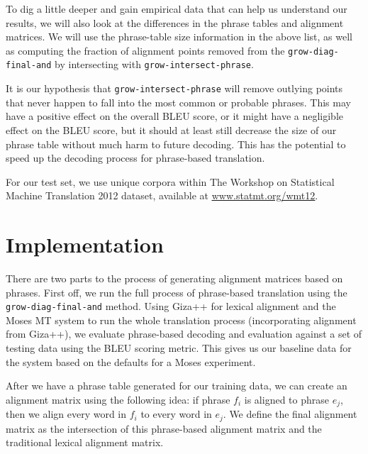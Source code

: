 \documentclass[twocolumn]{article}
\newcommand{\originalAlign}{\texttt{grow-diag-final-and}}
\newcommand{\phraseIntersectAlign}{\texttt{grow-intersect-phrase}}
\begin{document}
To dig a little deeper and gain empirical data that can help us understand our
results, we will also look at the differences in the phrase tables and alignment
matrices. We will use the phrase-table size information in the above list, as
well as computing the fraction of alignment points removed from the
\originalAlign{} by intersecting with \phraseIntersectAlign{}.

It is our hypothesis that \phraseIntersectAlign{} will remove outlying
points that never happen to fall into the most common or probable phrases. This
may have a positive effect on the overall BLEU score, or it might have a
negligible effect on the BLEU score, but it should at least still decrease the
size of our phrase table without much harm to future decoding. This has the
potential to speed up the decoding process for phrase-based translation.

For our test set, we use unique corpora within
The Workshop on Statistical Machine Translation 2012 dataset,
available at
\href{http://www.statmt.org/wmt12/dev.tgz}
     {\underline{www.statmt.org/wmt12}}.


\section{Implementation}
There are two parts to the process of generating alignment matrices based on
phrases. First off, we run the full process of phrase-based translation using
the \originalAlign{} method. Using Giza++ for lexical alignment and the Moses MT
system to run the whole translation process (incorporating alignment from
Giza++), we evaluate phrase-based decoding and evaluation against a set of
testing data using the BLEU scoring metric. This gives us our baseline data for
the system based on the defaults for a Moses experiment.

After we have a phrase table generated for our training data, we can create an
alignment matrix using the following idea: if phrase $f_i$ is aligned to phrase
$e_j$, then we align every word in $f_i$ to every word in $e_j$. We define the
final alignment matrix as the intersection of this phrase-based alignment matrix
and the traditional lexical alignment matrix.


\end{document}
